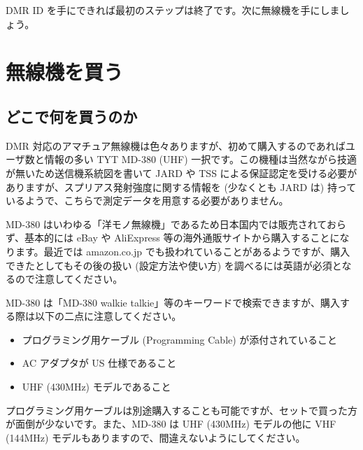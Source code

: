 \documentclass[a4j,oneside]{ujbook}
\begin{document}
DMR ID を手にできれば最初のステップは終了です。次に無線機を手にしましょう。

\chapter{無線機を買う}

\section{どこで何を買うのか}

DMR 対応のアマチュア無線機は色々ありますが、初めて購入するのであればユーザ数と情報の多い TYT MD-380 (UHF) 一択です。この機種は当然ながら技適が無いため送信機系統図を書いて JARD や TSS による保証認定を受ける必要がありますが、スプリアス発射強度に関する情報を (少なくとも JARD は) 持っているようで、こちらで測定データを用意する必要がありません。

MD-380 はいわゆる「洋モノ無線機」であるため日本国内では販売されておらず、基本的には eBay や AliExpress 等の海外通販サイトから購入することになります。最近では amazon.co.jp でも扱われていることがあるようですが、購入できたとしてもその後の扱い (設定方法や使い方) を調べるには英語が必須となるので注意してください。

MD-380 は「MD-380 walkie talkie」等のキーワードで検索できますが、購入する際は以下の二点に注意してください。
\begin{itemize}
 \item プログラミング用ケーブル (Programming Cable) が添付されていること
 \item AC アダプタが US 仕様であること
 \item UHF (430MHz) モデルであること
\end{itemize}
プログラミング用ケーブルは別途購入することも可能ですが、セットで買った方が面倒が少ないです。また、MD-380 は UHF (430MHz) モデルの他に VHF (144MHz) モデルもありますので、間違えないようにしてください。
\end{document}
